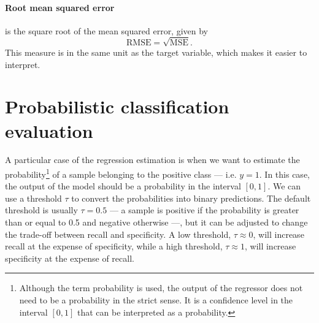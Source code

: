 \paragraph{Root mean squared error} is the square root of the mean squared error, given by
\begin{equation*}
  \text{RMSE} = \sqrt{\text{MSE}}\text{.}
\end{equation*}
This measure is in the same unit as the target variable, which makes it easier to
interpret.



\section{Probabilistic classification evaluation}

A particular case of the regression estimation is when we want to estimate the
probability\footnote{Although the term probability is used, the output of the regressor
does not need to be a probability in the strict sense.  It is a confidence level in the
interval $[0, 1]$ that can be interpreted as a probability.} of a sample belonging to the
positive class --- i.e. $y = 1$.  In this case, the output of the model should be a
probability in the interval $[0, 1]$.  We can use a threshold $\tau$ to convert the
probabilities into binary predictions.  The default threshold is usually $\tau = 0.5$ ---
a sample is positive if the probability is greater than or equal to 0.5 and negative
otherwise ---, but it can be adjusted to change the trade-off between recall and
specificity. A low threshold, $\tau \approx 0$, will increase recall at the expense of
specificity, while a high threshold, $\tau \approx 1$, will increase specificity at the
expense of recall.

